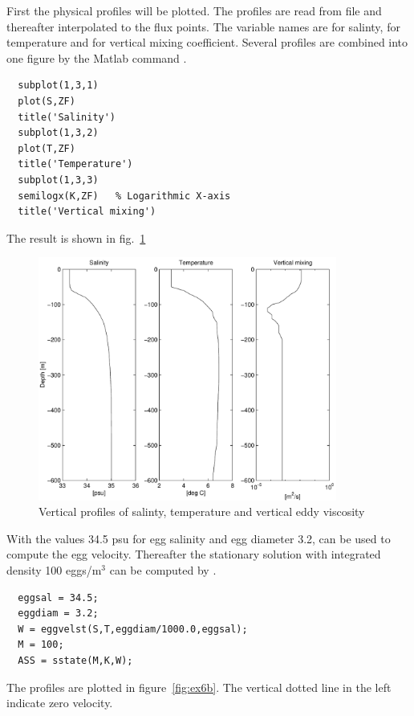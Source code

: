 First the physical profiles will be plotted. 
The profiles are read from file and thereafter interpolated to
the flux points. The variable names are  for salinty,
 for temperature and  for vertical mixing coefficient.
Several profiles are
combined into one figure by the Matlab command .
\begin{verbatim}
  subplot(1,3,1)
  plot(S,ZF)
  title('Salinity')
  subplot(1,3,2)
  plot(T,ZF)
  title('Temperature')
  subplot(1,3,3)
  semilogx(K,ZF)   % Logarithmic X-axis
  title('Vertical mixing')
\end{verbatim}
The result is shown in fig.~\ref{fig:ex6a}

\begin{figure}[!htb]
\begin{center}
\includegraphics[height=8cm]{ex6a}
\end{center}
\caption{Vertical profiles of salinty, temperature and 
         vertical eddy viscosity}
\label{fig:ex6a}
\end{figure}

With the values 34.5 psu for egg salinity and egg diameter 3.2\mm,
 can be used to compute the egg velocity. Thereafter
the stationary solution with integrated density 100 eggs/m$^3$ can be
computed by .
\begin{verbatim}
  eggsal = 34.5;
  eggdiam = 3.2;
  W = eggvelst(S,T,eggdiam/1000.0,eggsal);
  M = 100;
  ASS = sstate(M,K,W);
\end{verbatim}
The profiles are plotted in figure~\ref{fig:ex6b}. The vertical dotted
line in the left indicate zero velocity. 

